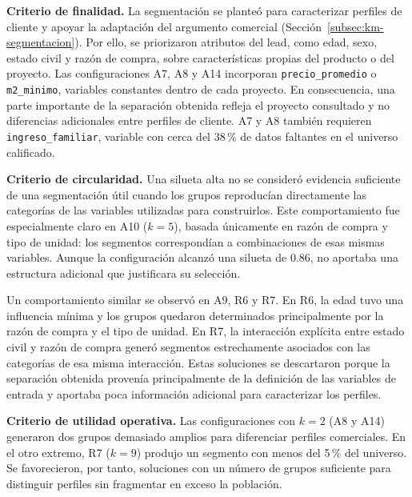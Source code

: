 \textbf{Criterio de finalidad.} La segmentación se planteó para caracterizar
perfiles de cliente y apoyar la adaptación del argumento comercial
(Sección~\ref{subsec:km-segmentacion}). Por ello, se priorizaron atributos del lead,
como edad, sexo, estado civil y razón de compra, sobre características propias del
producto o del proyecto. Las configuraciones A7, A8 y A14 incorporan
\texttt{precio\_promedio} o \texttt{m2\_minimo}, variables constantes dentro de cada
proyecto. En consecuencia, una parte importante de la separación obtenida refleja
el proyecto consultado y no diferencias adicionales entre perfiles de cliente. A7 y
A8 también requieren \texttt{ingreso\_familiar}, variable con cerca del 38\,\% de
datos faltantes en el universo calificado.

\textbf{Criterio de circularidad.} Una silueta alta no se consideró evidencia suficiente
de una segmentación útil cuando los grupos reproducían directamente las categorías de
las variables utilizadas para construirlos. Este comportamiento fue especialmente
claro en A10 ($k=5$), basada únicamente en razón de compra y tipo de unidad: los
segmentos correspondían a combinaciones de esas mismas variables. Aunque la
configuración alcanzó una silueta de 0.86, no aportaba una estructura adicional que
justificara su selección.

Un comportamiento similar se observó en A9, R6 y R7. En R6, la edad tuvo una
influencia mínima y los grupos quedaron determinados principalmente por la razón de
compra y el tipo de unidad. En R7, la interacción explícita entre estado civil y
razón de compra generó segmentos estrechamente asociados con las categorías de esa
misma interacción. Estas soluciones se descartaron porque la separación obtenida
provenía principalmente de la definición de las variables de entrada y aportaba poca
información adicional para caracterizar los perfiles.


\textbf{Criterio de utilidad operativa.} Las configuraciones con $k=2$ (A8 y A14)
generaron dos grupos demasiado amplios para diferenciar perfiles comerciales. En el
otro extremo, R7 ($k=9$) produjo un segmento con menos del 5\,\% del universo. Se
favorecieron, por tanto, soluciones con un número de grupos suficiente para distinguir
perfiles sin fragmentar en exceso la población.

